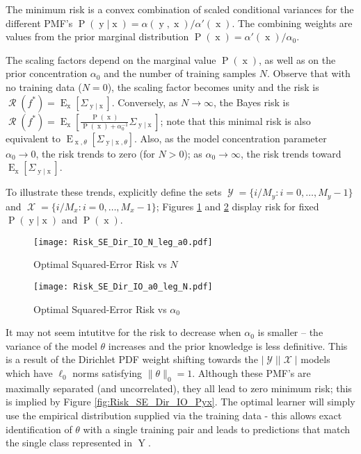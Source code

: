\documentclass[12pt]{report}
\DeclareMathOperator{\xrm}{\mathrm{x}}
\DeclareMathOperator{\yrm}{\mathrm{y}}
\DeclareMathOperator{\Yrm}{\mathrm{Y}}
\DeclareMathOperator{\Prm}{\mathrm{P}}
\DeclareMathOperator{\Erm}{\mathrm{E}}
\DeclareMathOperator{\Xcal}{\mathcal{X}}
\DeclareMathOperator{\Ycal}{\mathcal{Y}}
\DeclareMathOperator{\Rcal}{\mathcal{R}}
\begin{document}
The minimum risk is a convex combination of scaled conditional variances for the different PMF's $\Prm(\yrm | \xrm) = \alpha(\yrm,\xrm)/\alpha'(\xrm)$. The combining weights are values from the prior marginal distribution $\Prm(\xrm) = \alpha'(\xrm)/\alpha_0$. 

The scaling factors depend on the marginal value $\Prm(\xrm)$, as well as on the prior concentration $\alpha_0$ and the number of training samples $N$. Observe that with no training data ($N = 0$), the scaling factor becomes unity and the risk is $\Rcal(f^*) = \Erm_{\xrm} \left[ \Sigma_{\yrm | \xrm} \right]$. Conversely, as $N \to \infty$, the Bayes risk is $\Rcal(f^*) = \Erm_{\xrm} \left[ \frac{\Prm(\xrm)}{\Prm(\xrm) + \alpha_0^{-1}} \Sigma_{\yrm | \xrm} \right]$; note that this minimal risk is also equivalent to $\Erm_{\xrm,\theta} \left[ \Sigma_{\yrm | \xrm,\theta} \right]$. Also, as the model concentration parameter $\alpha_0 \to 0$, the risk trends to zero (for $N > 0$); as $\alpha_0 \to \infty$, the risk trends toward $\Erm_{\xrm} \left[ \Sigma_{\yrm | \xrm} \right]$.

To illustrate these trends, explicitly define the sets $\Ycal = \{ i/M_y : i = 0,\ldots,M_y-1 \}$ and $\Xcal = \{ i/M_x : i = 0,\ldots,M_x-1 \}$; Figures \ref{fig:Risk_SE_Dir_IO_N_leg_a0} and \ref{fig:Risk_SE_Dir_IO_a0_leg_N} display risk for fixed $\Prm(\yrm|\xrm)$ and $\Prm(\xrm)$.

\begin{figure}
\centering
\texttt{[image: Risk\_SE\_Dir\_IO\_N\_leg\_a0.pdf]}
\caption{Optimal Squared-Error Risk vs $N$}
\label{fig:Risk_SE_Dir_IO_N_leg_a0}
\end{figure}

\begin{figure}
\centering
\texttt{[image: Risk\_SE\_Dir\_IO\_a0\_leg\_N.pdf]}
\caption{Optimal Squared-Error Risk vs $\alpha_0$}
\label{fig:Risk_SE_Dir_IO_a0_leg_N}
\end{figure}

It may not seem intutitve for the risk to decrease when $\alpha_0$ is smaller -- the variance of the model $\theta$ increases and the prior knowledge is less definitive. This is a result of the Dirichlet PDF weight shifting towards the $|\Ycal||\Xcal|$ models which have $\ell_0$ norms satisfying $\| \theta \|_0 = 1$. Although these PMF's are maximally separated (and uncorrelated), they all lead to zero minimum risk; this is implied by Figure \ref{fig:Risk_SE_Dir_IO_Pyx}. The optimal learner will simply use the empirical distribution supplied via the training data - this allows exact identification of $\theta$ with a single training pair and leads to predictions that match the single class represented in $\Yrm$.
\end{document}
